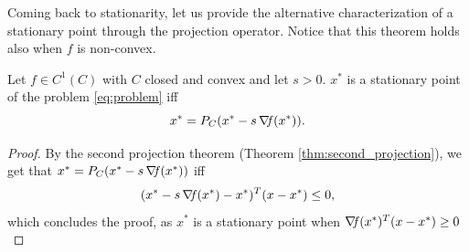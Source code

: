 \documentclass[10pt,a4paper]{article}
\begin{document}
Coming back to stationarity, let us provide the alternative characterization of a stationary point through the projection operator. Notice that this theorem holds also when $f$ is non-convex. 
\begin{theorem}\label{thm:stationarity_projection}
	Let $f\in C^1(C)$ with $C$ closed and convex and let $s>0$. $x^*$ is a stationary point of the problem \eqref{eq:problem} iff 
	\begin{equation}\label{eq:stationary_projection}
		x^*=P_C(x^*-s\operatorname*{\mathit{\nabla \!f}}(x^*)).
	\end{equation}
\end{theorem}
\begin{proof}
	By the second projection theorem (Theorem \ref{thm:second_projection}), we get that $x^*=P_C(x^*-s\operatorname*{\mathit{\nabla \!f}}(x^*))$ iff
	\begin{equation*}
		(x^*-s\operatorname*{\mathit{\nabla \!f}}(x^*) -x^*)^T(x-x^*)\leq 0, 
	\end{equation*}
which concludes the proof, as $x^*$ is a stationary point when $\operatorname*{\mathit{\nabla \!f}}(x^*)^T(x-x^*)\geq0$
\end{proof}
\end{document}
